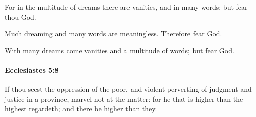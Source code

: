 			\begin{versebox}
					\item[BHS] 
					\item[LXX] 
					\item[ASV] For in the multitude of dreams there are vanities, and in many words: but fear thou God.
					\item[NIV] Much dreaming and many words are meaningless. Therefore fear God.
					\item[NRSV] With many dreams come vanities and a multitude of words; but fear God.
			\end{versebox}

		\paragraph{Ecclesiastes 5:8} %
			\label{ECCLESIASTES-5-8}

			If thou seest the oppression of the poor, and violent perverting of judgment and justice in a province, marvel not at the matter: for he that is higher than the highest regardeth; and there be higher than they.

